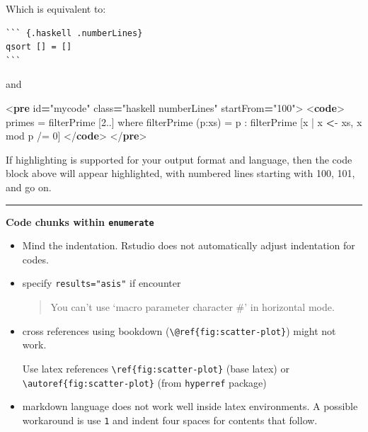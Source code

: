 \documentclass[
]{book}
\newenvironment{Shaded}{\begin{snugshade}}{\end{snugshade}}
\newcommand{\DataTypeTok}[1]{\textcolor[rgb]{0.13,0.29,0.53}{#1}}
\newcommand{\ErrorTok}[1]{\textcolor[rgb]{0.64,0.00,0.00}{\textbf{#1}}}
\newcommand{\KeywordTok}[1]{\textcolor[rgb]{0.13,0.29,0.53}{\textbf{#1}}}
\newcommand{\NormalTok}[1]{#1}
\newcommand{\OperatorTok}[1]{\textcolor[rgb]{0.81,0.36,0.00}{\textbf{#1}}}
\newcommand{\OtherTok}[1]{\textcolor[rgb]{0.56,0.35,0.01}{#1}}
\newcommand{\StringTok}[1]{\textcolor[rgb]{0.31,0.60,0.02}{#1}}
\theoremstyle{definition}
\theoremstyle{definition}
\theoremstyle{definition}
\theoremstyle{definition}
\theoremstyle{remark}
\begin{document}
Which is equivalent to:

\begin{verbatim}
``` {.haskell .numberLines}
qsort [] = []
```
\end{verbatim}

and

\begin{Shaded}
\begin{Highlighting}[]
\DataTypeTok{\textless{}}\KeywordTok{pre}\OtherTok{ id}\OperatorTok{=}\StringTok{"mycode"}\OtherTok{ class}\OperatorTok{=}\StringTok{"haskell numberLines"}\OtherTok{ startFrom}\OperatorTok{=}\StringTok{"100"}\DataTypeTok{\textgreater{}}
  \DataTypeTok{\textless{}}\KeywordTok{code}\DataTypeTok{\textgreater{}}
\NormalTok{  primes = filterPrime [2..] where}
\NormalTok{  filterPrime (p:xs) =}
\NormalTok{    p : filterPrime [x | x }\ErrorTok{\textless{}}\NormalTok{{-} xs, x \textasciigrave{}mod\textasciigrave{} p /= 0]}
  \DataTypeTok{\textless{}/}\KeywordTok{code}\DataTypeTok{\textgreater{}}
\DataTypeTok{\textless{}/}\KeywordTok{pre}\DataTypeTok{\textgreater{}}  
\end{Highlighting}
\end{Shaded}

If highlighting is supported for your output format and language, then the code block above will appear highlighted, with numbered lines starting with 100, 101, and go on.

\begin{center}\rule{0.5\linewidth}{0.5pt}\end{center}

\textbf{Code chunks within \texttt{enumerate}}

\begin{itemize}
\item
  Mind the indentation. Rstudio does not automatically adjust indentation for codes.
\item
  specify \texttt{results="asis"} if encounter

  \begin{quote}
  You can't use `macro parameter character \#' in horizontal mode.
  \end{quote}
\item
  cross references using bookdown (\texttt{\textbackslash{}@ref\{fig:scatter-plot\}}) might not work.

  Use latex references \texttt{\textbackslash{}ref\{fig:scatter-plot\}} (base latex) or \texttt{\textbackslash{}autoref\{fig:scatter-plot\}} (from \texttt{hyperref} package)
\item
  markdown language does not work well inside latex environments. A possible workaround is use \texttt{1} and indent four spaces for contents that follow.
\end{itemize}
\end{document}
